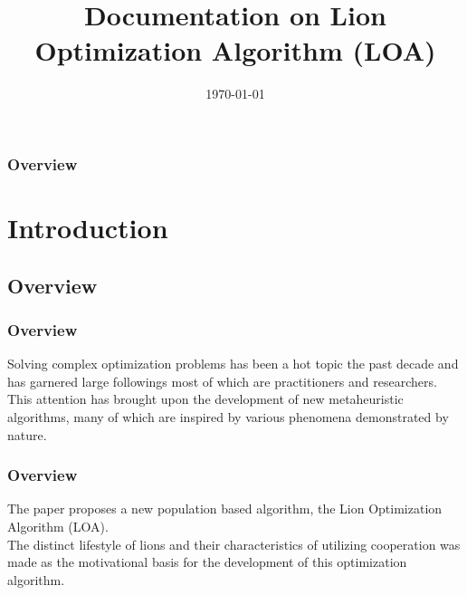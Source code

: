 \documentclass[xcolor=table]{beamer}
\title[Documentation on LOA]{Documentation on Lion Optimization Algorithm (LOA)} %
\author[Tyrel Dogup, Deo Fetalvero]
{%
   \texorpdfstring{
        \begin{columns}
            \column{.45\linewidth}
            \centering
            Tyrel Justin A. Dogup\\
            \href{mailto:tadogup1@up.edu.ph}{tadogup1@up.edu.ph}
            \column{.45\linewidth}
            \centering
            Deo Franc M. Fetalvero\\
            \href{mailto:dmfetalvero@up.edu.ph}{dmfetalvero@up.edu.ph}
        \end{columns}
   }
   {John Doe \& Jane Doe}
}
\date{\today} %
\begin{document}
\begin{frame}
\titlepage %
\end{frame}

\begin{frame}
\frametitle{Overview} %
\tableofcontents %
\end{frame}


\section{Introduction} %

\subsection{Overview} %

\begin{frame}
\frametitle{Overview}
Solving complex optimization problems has been a hot topic the past decade and has garnered large followings most of which are practitioners and researchers.\\
This attention has brought upon the development of new metaheuristic algorithms, many of which are inspired by various phenomena demonstrated by nature.
\end{frame}
\begin{frame}
\frametitle{Overview}
The paper proposes a new population based algorithm, the Lion Optimization Algorithm (LOA).\\The distinct lifestyle of lions and their characteristics of utilizing cooperation was made as the motivational basis for the development of this optimization algorithm.
\end{frame}
\end{document}
